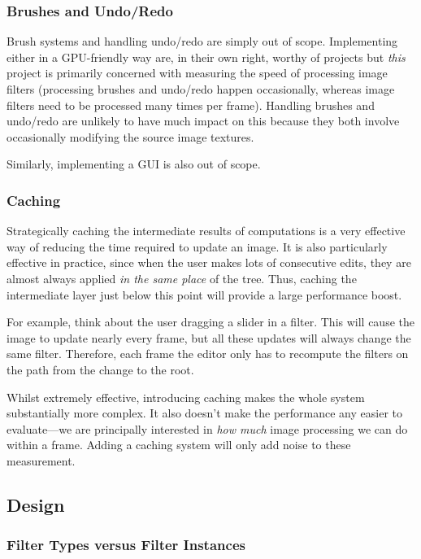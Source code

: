 \documentclass[12pt]{article}
\begin{document}
\subsubsection{Brushes and Undo/Redo}

Brush systems and handling undo/redo are simply out of scope.  Implementing either in a GPU-friendly
way are, in their own right, worthy of projects but \emph{this} project is primarily concerned with
measuring the speed of processing image filters (processing brushes and undo/redo happen
occasionally, whereas image filters need to be processed many times per frame).  Handling brushes
and undo/redo are unlikely to have much impact on this because they both involve occasionally
modifying the source image textures.

Similarly, implementing a GUI is also out of scope.

\subsubsection{Caching}

Strategically caching the intermediate results of computations is a very effective way of reducing
the time required to update an image.  It is also particularly effective in practice, since when the
user makes lots of consecutive edits, they are almost always applied \emph{in the same place} of the
tree.  Thus, caching the intermediate layer just below this point will provide a large performance
boost.

For example, think about the user dragging a slider in a filter.  This will cause the image to
update nearly every frame, but all these updates will always change the same filter.  Therefore,
each frame the editor only has to recompute the filters on the path from the change to the root.

Whilst extremely effective, introducing caching makes the whole system substantially more complex.
It also doesn't make the performance any easier to evaluate---we are principally interested in
\emph{how much} image processing we can do within a frame.  Adding a caching system will only add
noise to these measurement.

\subsection{Design}

\subsubsection{Filter Types versus Filter Instances}
\end{document}
